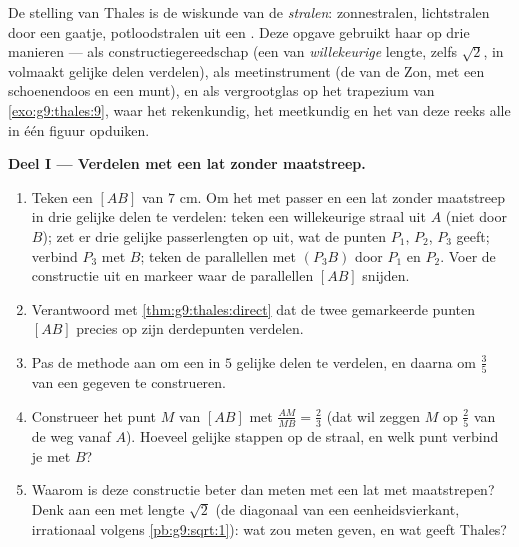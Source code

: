 \begin{problem}
\label{pb:g9:thales:1}
De stelling van Thales is de wiskunde van de \emph{stralen}: zonnestralen,
lichtstralen door een gaatje, potloodstralen uit een . Deze opgave gebruikt
haar op drie manieren --- als constructiegereedschap (een  van
\emph{willekeurige} lengte, zelfs $\sqrt2$, in volmaakt gelijke delen verdelen),
als meetinstrument (de  van de Zon, met een schoenendoos en een munt), en
als vergrootglas op het trapezium van \cref{exo:g9:thales:9}, waar het
rekenkundig, het meetkundig en het  van deze reeks alle in
één figuur opduiken.

\medskip
\noindent\textbf{Deel I --- Verdelen met een lat zonder maatstreep.}
\begin{enumerate}
  \item Teken een  $[AB]$ van $7$ cm. Om het met passer en een lat zonder
        maatstreep in drie gelijke delen te verdelen: teken een willekeurige straal
        uit $A$ (niet door $B$); zet er drie gelijke passerlengten op uit, wat de
        punten $P_1$, $P_2$, $P_3$ geeft; verbind $P_3$ met $B$; teken de
        parallellen met $(P_3 B)$ door $P_1$ en $P_2$. Voer de constructie uit en
        markeer waar de parallellen $[AB]$ snijden.
  \item Verantwoord met \cref{thm:g9:thales:direct} dat de twee gemarkeerde punten
        $[AB]$ precies op zijn derdepunten verdelen.
  \item Pas de methode aan om een  in $5$ gelijke delen te verdelen, en
        daarna om $\frac35$ van een gegeven  te construeren.
  \item Construeer het punt $M$ van $[AB]$ met $\frac{AM}{MB} = \frac23$ (dat wil
        zeggen $M$ op $\frac25$ van de weg vanaf $A$). Hoeveel gelijke stappen op de
        straal, en welk punt verbind je met $B$?
  \item Waarom is deze constructie beter dan meten met een lat met maatstrepen?
        Denk aan een  met lengte $\sqrt2$ (de diagonaal van een
        eenheidsvierkant, irrationaal volgens \cref{pb:g9:sqrt:1}): wat zou meten
        geven, en wat geeft Thales?
\end{enumerate}


\end{problem}
